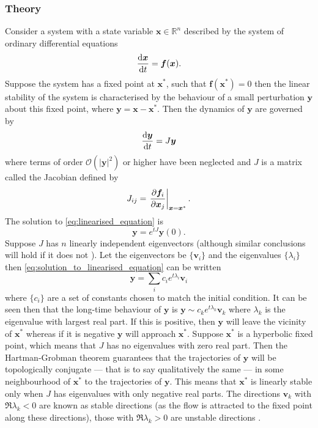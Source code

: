\subsubsection{Theory}
Consider a system with a state variable $\bm{x} \in \mathbb{R}^n$ described by the system of ordinary  differential equations
\begin{equation}
  \label{eq:generic_system}
  \dv{\bm{x}}{t} = \bm{f}(\bm{x}).
\end{equation}
Suppose the system has a fixed point at $\bm{x}^*$, such that $\bm{f}(\bm{x}^*)=0$ then the linear stability of the system \parencite{Strogatz2015} is characterised by
the behaviour of a small perturbation $\bm{y}$ about this fixed point, where $\bm{y} = \bm{x} - \bm{x}^*$. Then the dynamics of $\bm{y}$ are governed by
\begin{equation}
  \label{eq:linearised_equation}
  \dv{\bm{y}}{t} = J\bm{y} 
\end{equation}
where terms of order $\mathcal{O}\left(\left|\bm{y}\right|^2\right)$ or higher have been neglected and $J$ is a matrix called the Jacobian defined by
\begin{equation}
  \label{eq:jacobian}
  J_{ij} = \eval{\pdv{\bm{f}_i}{\bm{x}_j}}_{\bm{x}=\bm{x}^*}.
\end{equation}
The solution to \cref{eq:linearised_equation} is
\begin{equation}
  \label{eq:solution_to_linearised_equation}
  \bm{y} = e^{tJ}\bm{y}(0).
\end{equation}
Suppose $J$ has $n$ linearly independent eigenvectors (although similar conclusions will hold if it does not \parencite{guckenheimer2013}).
Let the eigenvectors be $\{\bm{v}_i\}$ and the eigenvalues $\{\lambda_i\}$ then \cref{eq:solution_to_linearised_equation} can be written
\begin{equation}
  \label{eq:solution_to_linearised_equation_eigen}
  \bm{y} = \sum_i c_i e^{t\lambda_i}\bm{v}_i
\end{equation}
where $\{c_i\}$ are a set of constants chosen to match the initial condition. It can be seen then that the long-time behaviour of $\bm{y}$ is
$\bm{y} \sim c_k e^{t\lambda_k} \bm{v}_k$ where $\lambda_k$ is the eigenvalue with largest real part. If this is positive, then $\bm{y}$ will leave the vicinity of $\bm{x}^*$ whereas
if it is negative $\bm{y}$ will approach $\bm{x}^*$. Suppose $\bm{x}^*$ is a hyperbolic fixed point, which means that $J$ has no eigenvalues with zero real part. Then the Hartman-Grobman theorem
\parencite{Grobman1959,Hartman1960,Hartman1963} guarantees that the trajectories of $\bm{y}$ will be topologically conjugate --- that is to say qualitatively the same --- in some
neighbourhood of $\bm{x}^*$ to the trajectories of $\bm{y}$.  This means that $\bm{x}^*$ is linearly stable only when $J$ has eigenvalues with only negative real parts.
The directions $\bm{v}_k$ with $\Re \lambda_k < 0$ are known as stable directions (as the flow is attracted to the fixed point along these directions),
those with $\Re \lambda_k > 0$ are unstable directions \parencite{Strogatz2015}.

